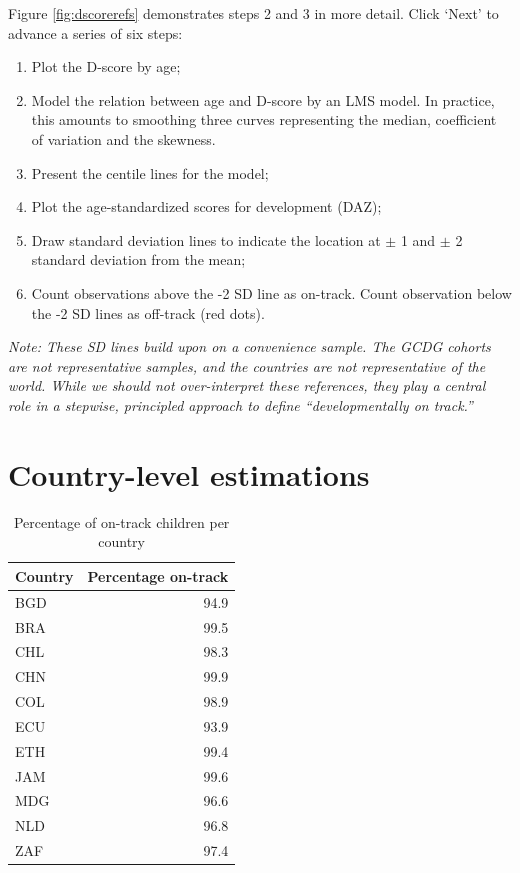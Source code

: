 \documentclass[
]{book}
\providecommand{\tightlist}{%
  \setlength{\itemsep}{0pt}\setlength{\parskip}{0pt}}
\begin{document}
Figure \ref{fig:dscorerefs} demonstrates steps 2 and 3 in more detail. Click `Next' to advance a series of six steps:

\begin{enumerate}
\def\labelenumi{\arabic{enumi}.}
\tightlist
\item
  Plot the D-score by age;
\item
  Model the relation between age and D-score by an LMS model. In practice, this amounts to smoothing three curves representing the median, coefficient of variation and the skewness.
\item
  Present the centile lines for the model;
\item
  Plot the age-standardized scores for development (DAZ);
\item
  Draw standard deviation lines to indicate the location at \(\pm\) 1 and \(\pm\) 2 standard deviation from the mean;
\item
  Count observations above the -2 SD line as on-track. Count observation below the -2 SD lines as off-track (red dots).
\end{enumerate}

\emph{Note: These SD lines build upon on a convenience sample. The GCDG cohorts are not representative samples, and the countries are not representative of the world. While we should not over-interpret these references, they play a central role in a stepwise, principled approach to define ``developmentally on track.''}

\hypertarget{sec:countrytrack}{%
\section{Country-level estimations}\label{sec:countrytrack}}

\begin{table}

\caption{\label{tab:ontrack}Percentage of on-track children per country}
\centering
\begin{tabular}[t]{l|r}
\hline
Country & Percentage on-track\\
\hline
BGD & 94.9\\
\hline
BRA & 99.5\\
\hline
CHL & 98.3\\
\hline
CHN & 99.9\\
\hline
COL & 98.9\\
\hline
ECU & 93.9\\
\hline
ETH & 99.4\\
\hline
JAM & 99.6\\
\hline
MDG & 96.6\\
\hline
NLD & 96.8\\
\hline
ZAF & 97.4\\
\hline
\end{tabular}
\end{table}
\end{document}
